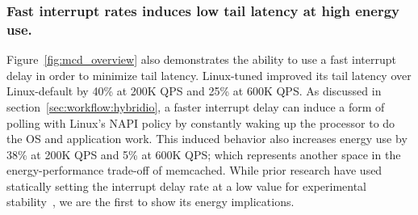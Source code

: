 





\subsubsection{Fast interrupt rates induces low tail latency at high energy use.} 
\label{sec:mcd:fastitr} 
Figure~\ref{fig:mcd_overview} also demonstrates the ability to use a fast interrupt delay in order to minimize tail latency. Linux-tuned improved its tail latency over Linux-default by 40\% at 200K QPS and 25\% at 600K QPS. As discussed in section~\ref{sec:workflow:hybridio}, a faster interrupt delay can induce a form of polling with Linux's NAPI policy by constantly waking up the processor to do the OS and application work. This induced behavior also increases energy use by 38\% at 200K QPS and 5\% at 600K QPS; which represents another space in the energy-performance trade-off of memcached. While prior research have used statically setting the interrupt delay rate at a low value for experimental stability~\cite{10.1145/2812806, 10.5555/3323234.3323265}, we are the first to show its energy implications.

